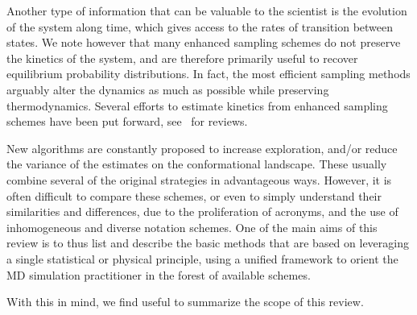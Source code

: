 \documentclass[9pt,review]{livecoms}
\begin{document}
Another type of information that can be valuable to the scientist is the evolution of the system along time, which gives access to the rates of transition between states. We note however that many enhanced sampling schemes do not preserve the kinetics of the system, and are therefore primarily useful to recover equilibrium probability distributions. In fact, the most efficient sampling methods arguably alter the dynamics as much as possible while preserving thermodynamics. Several efforts to estimate kinetics from enhanced sampling schemes have been put forward, see~\cite{BRUCE20181,doi:10.1146/annurev-physchem-042018-052340,Dickson:2017:1568-0266:2626,10.1021/acs.biochem.8b00977,https://doi.org/10.1002/wcms.1455,Kieninger2020} for reviews.

New algorithms are constantly proposed to increase exploration, and/or reduce the variance of the estimates on the conformational landscape. These usually combine several of the original strategies in advantageous ways. However, it is often difficult to compare these schemes, or even to simply understand their similarities and differences, due to the proliferation of acronyms, and the use of inhomogeneous and diverse notation schemes. One of the main aims of this review is to thus list and describe the basic methods that are based on leveraging a single statistical or physical principle, using a unified framework to orient the MD simulation practitioner in the forest of available schemes.

With this in mind, we find useful to summarize the scope of this review.
\end{document}
